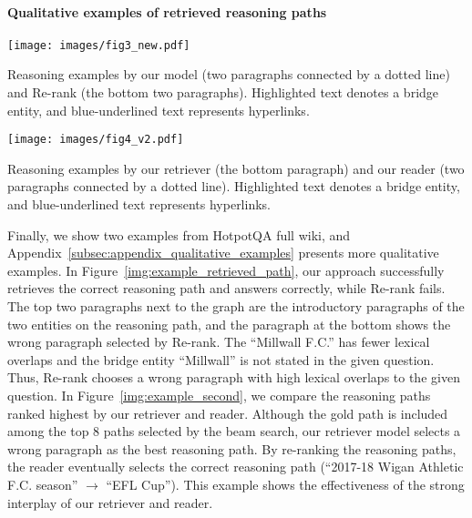 \vspace{-2mm}\paragraph{Qualitative examples of retrieved  reasoning paths}
\begin{table}[tb!]
\begin{minipage}{.51\linewidth}
    \makeatletter          %
    \def\@captype{figure}  %
    \makeatother           %
    \texttt{[image: images/fig3\_new.pdf]}
      \caption{Reasoning examples by our model (two paragraphs connected by a dotted line) and Re-rank (the bottom two paragraphs). Highlighted text denotes a bridge entity, and blue-underlined text represents hyperlinks.
      }\label{img:example_retrieved_path}
\end{minipage}
\hspace{0.2cm}
\begin{minipage}{.45\linewidth}
    \makeatletter          %
    \def\@captype{figure}  %
    \makeatother           %
    \texttt{[image: images/fig4\_v2.pdf]}
      \caption{Reasoning examples by our retriever (the bottom paragraph) and our reader (two paragraphs connected by a dotted line). Highlighted text denotes a bridge entity, and blue-underlined text represents hyperlinks.
      }\label{img:example_second}
\end{minipage}
\end{table}
Finally, we show two examples from HotpotQA full wiki, and Appendix~\ref{subsec:appendix_qualitative_examples} presents more qualitative examples.
In Figure~\ref{img:example_retrieved_path}, our approach successfully retrieves the correct reasoning path and answers correctly, while Re-rank fails. 
The top two paragraphs next to the graph are the introductory paragraphs of the two entities on the reasoning path, and the paragraph at the bottom shows the wrong paragraph selected by Re-rank.
The ``Millwall F.C.'' has fewer lexical overlaps and the bridge entity ``Millwall'' is not stated in the given question. Thus, Re-rank chooses a wrong paragraph with high lexical overlaps to the given question.
In Figure~\ref{img:example_second}, we compare the reasoning paths ranked highest by our retriever and reader. Although the gold path is included among the top 8 paths selected by the beam search, our retriever model selects a wrong paragraph as the best reasoning path. 
By re-ranking the reasoning paths, the reader eventually selects the correct reasoning path (``2017-18 Wigan Athletic F.C. season'' $\rightarrow$ ``EFL Cup'').
This example shows the effectiveness of the strong interplay of our retriever and reader.

